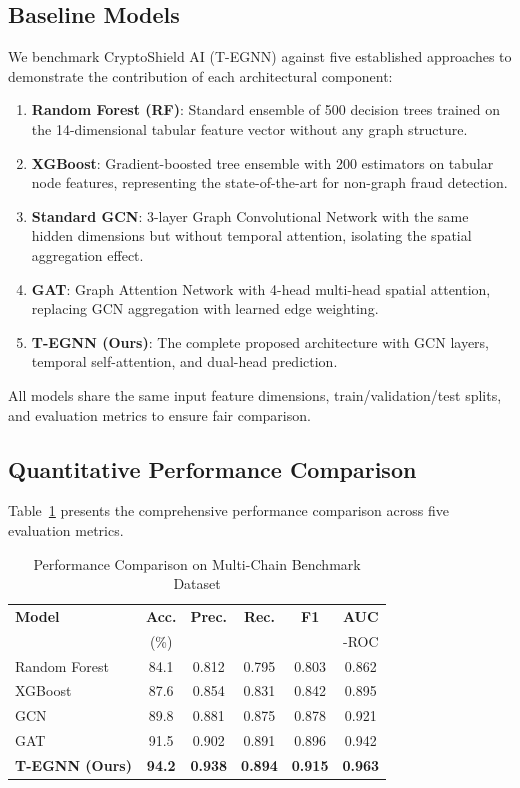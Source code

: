 \documentclass[conference]{IEEEtran}
\begin{document}
\subsection{Baseline Models}
We benchmark CryptoShield AI (T-EGNN) against five established approaches to demonstrate the contribution of each architectural component:
\begin{enumerate}
    \item \textbf{Random Forest (RF)}: Standard ensemble of 500 decision trees trained on the 14-dimensional tabular feature vector without any graph structure.
    \item \textbf{XGBoost}: Gradient-boosted tree ensemble with 200 estimators on tabular node features, representing the state-of-the-art for non-graph fraud detection.
    \item \textbf{Standard GCN}: 3-layer Graph Convolutional Network with the same hidden dimensions but without temporal attention, isolating the spatial aggregation effect.
    \item \textbf{GAT}: Graph Attention Network with 4-head multi-head spatial attention, replacing GCN aggregation with learned edge weighting.
    \item \textbf{T-EGNN (Ours)}: The complete proposed architecture with GCN layers, temporal self-attention, and dual-head prediction.
\end{enumerate}

All models share the same input feature dimensions, train/validation/test splits, and evaluation metrics to ensure fair comparison.

\subsection{Quantitative Performance Comparison}

Table~\ref{tab:results} presents the comprehensive performance comparison across five evaluation metrics.

\begin{table}[htbp]
\caption{Performance Comparison on Multi-Chain Benchmark Dataset}
\label{tab:results}
\centering
\small
\begin{tabular}{@{}lccccc@{}}
\toprule
\textbf{Model} & \textbf{Acc.} & \textbf{Prec.} & \textbf{Rec.} & \textbf{F1} & \textbf{AUC} \\
& (\%) & & & & -ROC \\
\midrule
Random Forest & 84.1 & 0.812 & 0.795 & 0.803 & 0.862 \\
XGBoost & 87.6 & 0.854 & 0.831 & 0.842 & 0.895 \\
GCN & 89.8 & 0.881 & 0.875 & 0.878 & 0.921 \\
GAT & 91.5 & 0.902 & 0.891 & 0.896 & 0.942 \\
\midrule
\textbf{T-EGNN (Ours)} & \textbf{94.2} & \textbf{0.938} & \textbf{0.894} & \textbf{0.915} & \textbf{0.963} \\
\bottomrule
\end{tabular}
\end{table}
\end{document}
